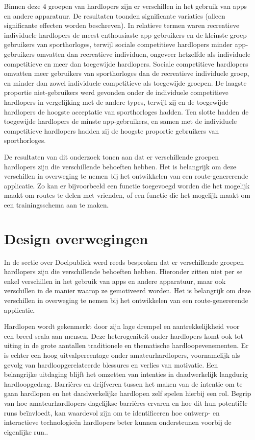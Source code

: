     Binnen deze 4 groepen van hardlopers zijn er verschillen in het gebruik van apps en andere apparatuur. 
    De resultaten toonden significante variaties (alleen significante effecten worden beschreven). 
    In relatieve termen waren recreatieve individuele hardlopers de meest enthousiaste app-gebruikers
    en de kleinste groep gebruikers van sporthorloges, terwijl sociale competitieve hardlopers minder app-gebruikers 
    omvatten dan recreatieve individuen, ongeveer hetzelfde als individuele competitieve
    en meer dan toegewijde hardlopers. Sociale competitieve hardlopers omvatten meer gebruikers van sporthorloges 
    dan de recreatieve individuele groep, en minder dan zowel individuele competitieve
    als toegewijde groepen. De laagste proportie niet-gebruikers werd gevonden 
    onder de individuele competitieve hardlopers in vergelijking met de andere types, 
    terwijl zij en de toegewijde hardlopers de hoogste acceptatie van sporthorloges hadden. 
    Ten slotte hadden de toegewijde hardlopers de minste app-gebruikers, 
    en samen met de individuele competitieve hardlopers hadden zij de hoogste proportie gebruikers van sporthorloges.

    De resultaten van dit onderzoek tonen aan dat er verschillende groepen hardlopers zijn die verschillende behoeften hebben. 
    Het is belangrijk om deze verschillen in overweging te nemen bij het ontwikkelen van een route-genererende applicatie.
    Zo kan er bijvoorbeeld een functie toegevoegd worden die het mogelijk maakt om routes te delen met vrienden,
    of een functie die het mogelijk maakt om een trainingsschema aan te maken.

    \section{Design overwegingen}

    In de sectie over Doelpubliek werd reeds besproken dat er verschillende groepen hardlopers zijn die verschillende behoeften hebben.
    Hieronder zitten niet per se enkel verschillen in het gebruik van apps en andere apparatuur, maar ook verschillen in de manier waarop ze gemotiveerd worden.
    Het is belangrijk om deze verschillen in overweging te nemen bij het ontwikkelen van een route-genererende applicatie.

    Hardlopen wordt gekenmerkt door zijn lage drempel en aantrekkelijkheid voor een breed scala aan mensen. 
    Deze heterogeniteit onder hardlopers komt ook tot uiting in de grote aantallen traditionele en thematische hardloopevenementen. 
    Er is echter een hoog uitvalpercentage onder amateurhardlopers, voornamelijk als gevolg van hardloopgerelateerde blessures en verlies van motivatie. 
    Een belangrijke uitdaging blijft het omzetten van intenties in daadwerkelijk langdurig hardloopgedrag. 
    Barrières en drijfveren tussen het maken van de intentie om te gaan hardlopen en het daadwerkelijke hardlopen zelf spelen hierbij een rol. 
    Begrip van hoe amateurhardlopers dagelijkse barrières ervaren en hoe dit hun potentiële runs beïnvloedt, kan waardevol zijn 
    om te identificeren hoe ontwerp- en interactieve technologieën hardlopers beter kunnen ondersteunen voorbij de eigenlijke run.\textcite{Menheere2020}.

